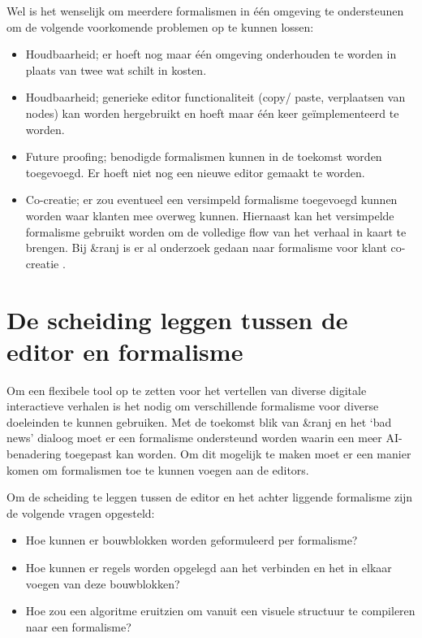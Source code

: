 Wel is het wenselijk om meerdere formalismen in één omgeving te ondersteunen om de volgende voorkomende problemen op te kunnen lossen:

\begin{itemize}
    \item Houdbaarheid; er hoeft nog maar één omgeving onderhouden te worden in plaats van twee wat schilt in kosten.
    \item Houdbaarheid; generieke editor functionaliteit (copy/ paste, verplaatsen van nodes) kan worden hergebruikt en hoeft maar één keer geïmplementeerd te worden.
    \item Future proofing; benodigde formalismen kunnen in de toekomst worden toegevoegd. Er hoeft niet nog een nieuwe editor gemaakt te worden.
    \item Co-creatie; er zou eventueel een versimpeld formalisme toegevoegd kunnen worden waar klanten mee overweg kunnen. Hiernaast kan het versimpelde formalisme gebruikt worden om de volledige flow van het verhaal in kaart te brengen. Bij \&ranj is er al onderzoek gedaan naar formalisme voor klant co-creatie \cite{Schipper2015}.
\end{itemize}

\section{De scheiding leggen tussen de editor en formalisme}
Om een flexibele tool op te zetten voor het vertellen van diverse digitale interactieve verhalen is het nodig om verschillende formalisme voor diverse doeleinden te kunnen gebruiken. Met de toekomst blik van \&ranj en het ‘bad news’ dialoog moet er een formalisme ondersteund worden waarin een meer AI-benadering toegepast kan worden. Om dit mogelijk te maken moet er een manier komen om formalismen toe te kunnen voegen aan de editors.

Om de scheiding te leggen tussen de editor en het achter liggende formalisme zijn de volgende vragen opgesteld:

\begin{itemize}
    \item Hoe kunnen er bouwblokken worden geformuleerd per formalisme?
    \item Hoe kunnen er regels worden opgelegd aan het verbinden en het in elkaar voegen van deze bouwblokken?
    \item Hoe zou een algoritme eruitzien om vanuit een visuele structuur te compileren naar een formalisme?
\end{itemize}


